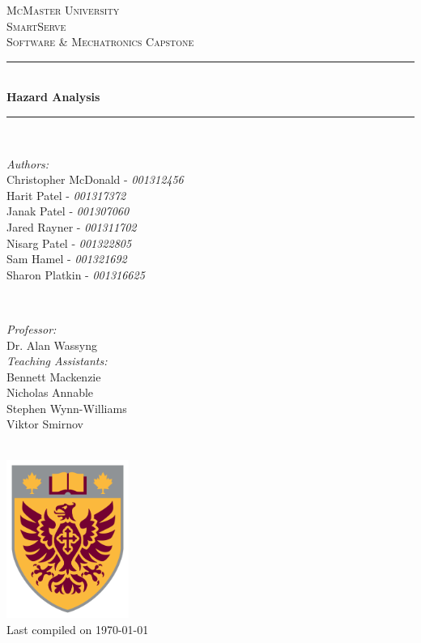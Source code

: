 \documentclass[11pt]{article}
\begin{document}
\begin{titlepage}
	\newcommand{\HRule}{\rule{\linewidth}{0.2mm}}
	\begin{center}
	\textsc{\LARGE McMaster University}\\[1.5cm]

	\textsc{\Large SmartServe}\\[0.5cm]
	\textsc{\large Software \& Mechatronics Capstone}\\[0.5cm]

	\HRule\\[0.4cm]
		{\huge\bfseries Hazard Analysis}\\[0.4cm]
	\HRule\\[0.4cm]

	\begin{minipage}[t][][t]{0.5\textwidth}
		\begin{flushleft} \large
			\emph{Authors:}\\
			Christopher McDonald - \textit{001312456} \\
			Harit Patel - \textit{001317372}\\
			Janak Patel - \textit{001307060} \\
			Jared Rayner - \textit{001311702}\\
			Nisarg Patel - \textit{001322805} \\
			Sam Hamel - \textit{001321692} \\
			Sharon Platkin - \textit{001316625} \\
		\end{flushleft}
	\end{minipage}
	~
	\begin{minipage}[t][][t]{0.4\textwidth}
		\begin{flushright} \large
			\emph{Professor:} \\
			Dr. Alan Wassyng \\[0.4cm]
			\emph{Teaching Assistants:} \\
			Bennett Mackenzie \\
			Nicholas Annable \\
			Stephen Wynn-Williams \\
			Viktor Smirnov
		\end{flushright}
	\end{minipage}\\[2cm]

	\includegraphics[width=0.3\textwidth]{logo.png} \\
	{\large Last compiled on \today}
	\end{center}

\end{titlepage}
\end{document}
